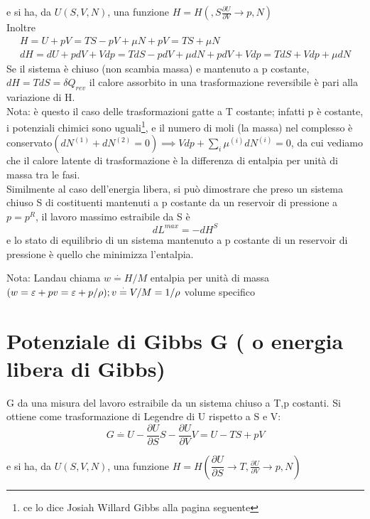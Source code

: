 \documentclass[a4paper,11pt]{report}
\newcommand{\defeq}{\overset{\cdot}{=}}
\begin{document}
			e si ha, da $U(S,V,N)$, una funzione $H = H(,S\frac{\partial U}{\partial V} \rightarrow p,N)$\\
			
			Inoltre 
			\begin{equation}
				\begin{aligned}
				H = U + pV = TS -pV +\mu N + pV = TS + \mu N \\
			 	dH = dU +pdV + Vdp = TdS - pdV + \mu dN + pdV + Vdp = TdS + Vdp + \mu dN
				\end{aligned}
			\end{equation}
			Se il sistema è chiuso (non scambia massa) e mantenuto a p costante, $dH = TdS = \delta Q_{rev}$ il calore assorbito in una trasformazione reversibile è pari alla variazione di H.\\
			
			Nota: è questo il caso delle trasformazioni gatte a T costante; infatti p è costante, i potenziali chimici sono uguali\footnote{ce lo dice Josiah Willard Gibbs alla pagina seguente}, e il numero di moli (la massa) nel complesso è conservato$(dN^{(1)} + dN^{(2)} = 0) \implies Vdp + \sum_i \mu^{(i)} dN^{(i)} = 0$, da cui vediamo che il calore latente di trasformazione è la differenza di entalpia per unità di massa tra le fasi.\\
			Similmente al caso dell'energia libera, si può dimostrare che preso un sistema chiuso S di costituenti mantenuti a p costante da un reservoir di pressione a $p=p^R$, il lavoro massimo estraibile da S è 
			$$
			dL^{max} = -dH^S
			$$
			e lo stato di equilibrio di un sistema mantenuto a p costante di un reservoir di pressione è quello che minimizza l'entalpia.
			
			Nota: Landau chiama $w \overset{\cdot}{=} H/M$ entalpia per unità di massa $(w = \varepsilon + pv = \varepsilon + p/\rho);\\
			v \defeq V/M = 1/\rho$ volume specifico
		
	\section{Potenziale di Gibbs G ( o energia libera di Gibbs)}
		G da una misura del lavoro estraibile da un sistema chiuso a T,p costanti. Si ottiene come trasformazione di Legendre di U rispetto a S e V:
		$$
		G \defeq U - \dfrac{\partial U}{\partial S}S - \dfrac{\partial U}{\partial V}V = U -TS + pV
		$$
		
		e si ha, da $U(S,V,N)$, una funzione $H = H(\dfrac{\partial U}{\partial S}\rightarrow T,\frac{\partial U}{\partial V} \rightarrow p,N)$\\ 
		
\end{document}
